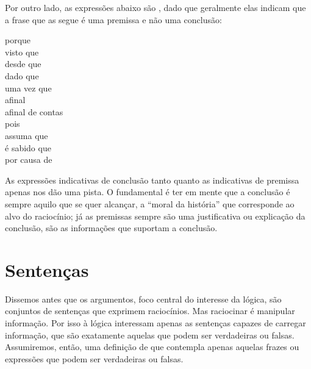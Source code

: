 Por outro lado, as expressões abaixo são , dado que geralmente elas indicam que a frase que as segue é uma premissa e não uma conclusão:
	\begin{center}
		porque\\ visto que\\ desde que\\ dado que\\ uma vez que\\ afinal\\ afinal de contas\\ pois\\ assuma que\\ é sabido que\\ por causa de
	\end{center}
As expressões indicativas de conclusão tanto quanto as indicativas de premissa apenas nos dão uma pista.
O fundamental é ter em mente que a conclusão é sempre aquilo que se quer alcançar, a ``moral da história'' que corresponde ao alvo do raciocínio; já as premissas sempre são uma justificativa ou explicação da conclusão, são as informações que suportam a conclusão. 

\section{Sentenças}
\label{intro.sentences}



Dissemos antes que os argumentos, foco central do interesse da lógica, são conjuntos de sentenças que exprimem raciocínios.
Mas raciocinar é manipular informação.
Por isso à lógica interessam apenas as sentenças capazes de carregar informação, que são exatamente aquelas que podem ser verdadeiras ou falsas.
Assumiremos, então, uma definição de  que contempla apenas aquelas frazes ou expressões que podem ser verdadeiras ou falsas.

